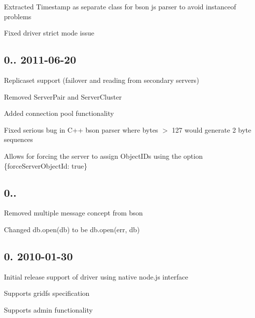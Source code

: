 \begin{DoxyItemize}
\item Extracted Timestamp as separate class for bson js parser to avoid instanceof problems
\item Fixed driver strict mode issue
\end{DoxyItemize}

\subsection*{0.. 2011-\/06-\/20 }


\begin{DoxyItemize}
\item Replicaset support (failover and reading from secondary servers)
\item Removed Server\+Pair and Server\+Cluster
\item Added connection pool functionality
\item Fixed serious bug in C++ bson parser where bytes $>$ 127 would generate 2 byte sequences
\item Allows for forcing the server to assign Object\+ID\textquotesingle{}s using the option \{force\+Server\+Object\+Id\+: true\}
\end{DoxyItemize}

\subsection*{0.. }


\begin{DoxyItemize}
\item Removed multiple message concept from bson
\item Changed db.\+open(db) to be db.\+open(err, db)
\end{DoxyItemize}

\subsection*{0. 2010-\/01-\/30 }


\begin{DoxyItemize}
\item Initial release support of driver using native node.\+js interface
\item Supports gridfs specification
\item Supports admin functionality 
\end{DoxyItemize}
